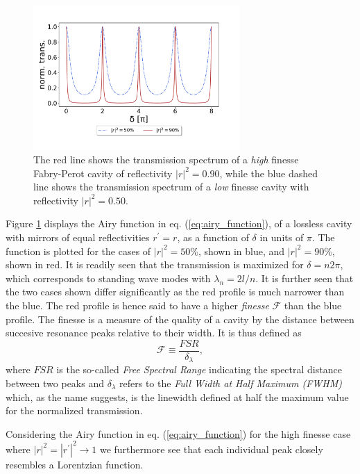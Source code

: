 \begin{figure}[h!]
    \centering
    \includegraphics[width=0.7\textwidth]{figures/fabry_perot_high_and_low_finesse.pdf}
    \caption{The red line shows the transmission spectrum of a \emph{high} finesse Fabry-Perot cavity of reflectivity $|r|^2 = 0.90$, while the blue dashed line shows the transmission spectrum of a \emph{low} finesse cavity with reflectivity $|r|^2 = 0.50$.}
    \label{fig:fabry_perot_trans}
\end{figure}

Figure \ref{fig:fabry_perot_trans} displays the Airy function in eq. (\ref{eq:airy_function}), of a lossless cavity with mirrors of equal reflectivities $r^{\prime} = r$, as a function of $\delta$ in units of $\pi$. The function is plotted for the cases of $|r|^2 = 50 \%$, shown in blue, and $|r|^2 = 90 \%$, shown in red. It is readily seen that the transmission is maximized for $\delta = n 2 \pi$, which corresponds to standing wave modes with $\lambda_n = 2l/n$. It is further seen that the two cases shown differ significantly as the red profile is much narrower than the blue. The red profile is hence said to have a higher \emph{finesse} $\mathcal{F}$ than the blue profile. The finesse is a measure of the quality of a cavity by the distance between succesive resonance peaks relative to their width. It is thus defined as
\begin{equation}
    \mathcal{F} \equiv \frac{FSR}{\delta_{\lambda}},
    \label{eq:finesse_definition}
\end{equation}
where $FSR$ is the so-called \emph{Free Spectral Range} indicating the spectral distance between two peaks and $\delta_{\lambda}$ refers to the \emph{Full Width at Half Maximum (FWHM)} which, as the name suggests, is the linewidth defined at half the maximum value for the normalized transmission.

Considering the Airy function in eq. (\ref{eq:airy_function}) for the high finesse case where $|r|^2 = |r^{\prime}|^2 \rightarrow 1$ we furthermore see that each individual peak closely resembles a Lorentzian function. 

